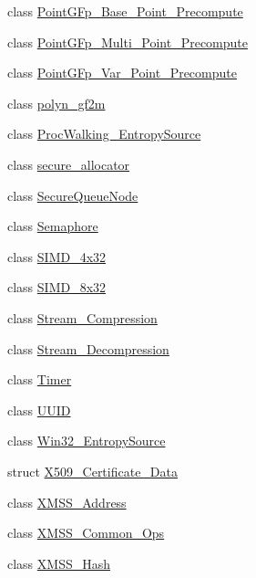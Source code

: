 \begin{DoxyCompactItemize}
\item 
class \mbox{\hyperlink{class_botan_1_1_point_g_fp___base___point___precompute}{Point\+G\+Fp\+\_\+\+Base\+\_\+\+Point\+\_\+\+Precompute}}
\item 
class \mbox{\hyperlink{class_botan_1_1_point_g_fp___multi___point___precompute}{Point\+G\+Fp\+\_\+\+Multi\+\_\+\+Point\+\_\+\+Precompute}}
\item 
class \mbox{\hyperlink{class_botan_1_1_point_g_fp___var___point___precompute}{Point\+G\+Fp\+\_\+\+Var\+\_\+\+Point\+\_\+\+Precompute}}
\item 
class \mbox{\hyperlink{class_botan_1_1polyn__gf2m}{polyn\+\_\+gf2m}}
\item 
class \mbox{\hyperlink{class_botan_1_1_proc_walking___entropy_source}{Proc\+Walking\+\_\+\+Entropy\+Source}}
\item 
class \mbox{\hyperlink{class_botan_1_1secure__allocator}{secure\+\_\+allocator}}
\item 
class \mbox{\hyperlink{class_botan_1_1_secure_queue_node}{Secure\+Queue\+Node}}
\item 
class \mbox{\hyperlink{class_botan_1_1_semaphore}{Semaphore}}
\item 
class \mbox{\hyperlink{class_botan_1_1_s_i_m_d__4x32}{S\+I\+M\+D\+\_\+4x32}}
\item 
class \mbox{\hyperlink{class_botan_1_1_s_i_m_d__8x32}{S\+I\+M\+D\+\_\+8x32}}
\item 
class \mbox{\hyperlink{class_botan_1_1_stream___compression}{Stream\+\_\+\+Compression}}
\item 
class \mbox{\hyperlink{class_botan_1_1_stream___decompression}{Stream\+\_\+\+Decompression}}
\item 
class \mbox{\hyperlink{class_botan_1_1_timer}{Timer}}
\item 
class \mbox{\hyperlink{class_botan_1_1_u_u_i_d}{U\+U\+ID}}
\item 
class \mbox{\hyperlink{class_botan_1_1_win32___entropy_source}{Win32\+\_\+\+Entropy\+Source}}
\item 
struct \mbox{\hyperlink{struct_botan_1_1_x509___certificate___data}{X509\+\_\+\+Certificate\+\_\+\+Data}}
\item 
class \mbox{\hyperlink{class_botan_1_1_x_m_s_s___address}{X\+M\+S\+S\+\_\+\+Address}}
\item 
class \mbox{\hyperlink{class_botan_1_1_x_m_s_s___common___ops}{X\+M\+S\+S\+\_\+\+Common\+\_\+\+Ops}}
\item 
class \mbox{\hyperlink{class_botan_1_1_x_m_s_s___hash}{X\+M\+S\+S\+\_\+\+Hash}}

\end{DoxyCompactItemize}
